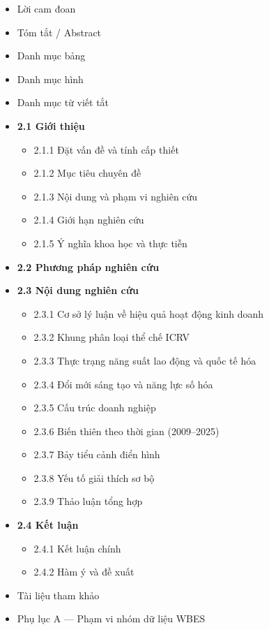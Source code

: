 \documentclass[12pt,a4paper]{article}
\providecommand{\tightlist}{\setlength{\itemsep}{0pt}\setlength{\parskip}{0pt}}
\begin{document}
\begin{itemize}
\tightlist
\item
  Lời cam đoan
\item
  Tóm tắt / Abstract
\item
  Danh mục bảng
\item
  Danh mục hình
\item
  Danh mục từ viết tắt
\item
  \textbf{2.1 Giới thiệu}

  \begin{itemize}
  \tightlist
  \item
    2.1.1 Đặt vấn đề và tính cấp thiết
  \item
    2.1.2 Mục tiêu chuyên đề
  \item
    2.1.3 Nội dung và phạm vi nghiên cứu
  \item
    2.1.4 Giới hạn nghiên cứu
  \item
    2.1.5 Ý nghĩa khoa học và thực tiễn
  \end{itemize}
\item
  \textbf{2.2 Phương pháp nghiên cứu}
\item
  \textbf{2.3 Nội dung nghiên cứu}

  \begin{itemize}
  \tightlist
  \item
    2.3.1 Cơ sở lý luận về hiệu quả hoạt động kinh doanh
  \item
    2.3.2 Khung phân loại thể chế ICRV
  \item
    2.3.3 Thực trạng năng suất lao động và quốc tế hóa
  \item
    2.3.4 Đổi mới sáng tạo và năng lực số hóa
  \item
    2.3.5 Cấu trúc doanh nghiệp
  \item
    2.3.6 Biến thiên theo thời gian (2009--2025)
  \item
    2.3.7 Bảy tiểu cảnh điển hình
  \item
    2.3.8 Yếu tố giải thích sơ bộ
  \item
    2.3.9 Thảo luận tổng hợp
  \end{itemize}
\item
  \textbf{2.4 Kết luận}

  \begin{itemize}
  \tightlist
  \item
    2.4.1 Kết luận chính
  \item
    2.4.2 Hàm ý và đề xuất
  \end{itemize}
\item
  Tài liệu tham khảo
\item
  Phụ lục A --- Phạm vi nhóm dữ liệu WBES
\end{itemize}
\end{document}
